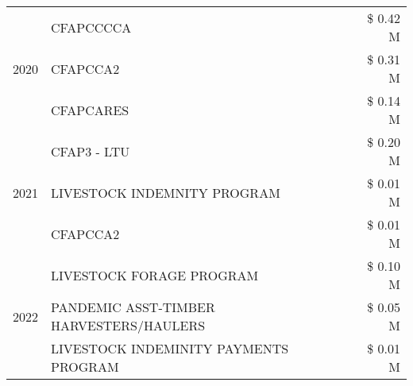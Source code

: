 \begin{tabular}{llr}
\cline{1-3}
\multirow[t]{3}{*}{2020} & CFAPCCCCA & \$ 0.42 M \\
 & CFAPCCA2 & \$ 0.31 M \\
 & CFAPCARES & \$ 0.14 M \\
\cline{1-3}
\multirow[t]{3}{*}{2021} & CFAP3 - LTU & \$ 0.20 M \\
 & LIVESTOCK INDEMNITY PROGRAM & \$ 0.01 M \\
 & CFAPCCA2 & \$ 0.01 M \\
\cline{1-3}
\multirow[t]{3}{*}{2022} & LIVESTOCK FORAGE PROGRAM & \$ 0.10 M \\
 & PANDEMIC ASST-TIMBER HARVESTERS/HAULERS & \$ 0.05 M \\
 & LIVESTOCK INDEMINITY PAYMENTS PROGRAM & \$ 0.01 M \\
\cline{1-3}
\bottomrule
\end{tabular}
